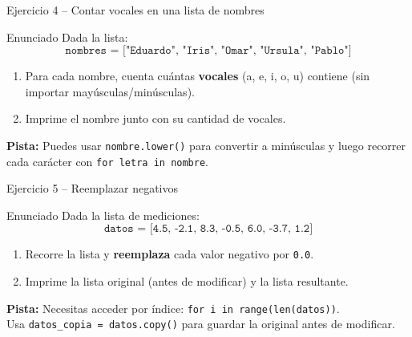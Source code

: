\documentclass[aspectratio=169,xcolor=dvipsnames]{beamer}
\begin{document}
\begin{frame}{Ejercicio 4 -- Contar vocales en una lista de nombres}
    \begin{block}{Enunciado}
        Dada la lista:
        \[ \texttt{nombres = ["Eduardo", "Iris", "Omar", "Ursula", "Pablo"]} \]
        \begin{enumerate}
            \item Para cada nombre, cuenta cuántas \textbf{vocales} (a, e, i, o, u) contiene (sin importar mayúsculas/minúsculas).
            \item Imprime el nombre junto con su cantidad de vocales.
        \end{enumerate}
    \end{block}
    \vspace{0.2cm}
    \textbf{Pista:} Puedes usar \texttt{nombre.lower()} para convertir a minúsculas y luego recorrer cada carácter con \texttt{for letra in nombre}.
\end{frame}

\begin{frame}{Ejercicio 5 -- Reemplazar negativos}
    \begin{block}{Enunciado}
        Dada la lista de mediciones:
        \[ \texttt{datos = [4.5, -2.1, 8.3, -0.5, 6.0, -3.7, 1.2]} \]
        \begin{enumerate}
            \item Recorre la lista y \textbf{reemplaza} cada valor negativo por \texttt{0.0}.
            \item Imprime la lista original (antes de modificar) y la lista resultante.
        \end{enumerate}
    \end{block}
    \vspace{0.2cm}
    \textbf{Pista:} Necesitas acceder por índice: \texttt{for i in range(len(datos))}.\\
    Usa \texttt{datos\_copia = datos.copy()} para guardar la original antes de modificar.
\end{frame}
\end{document}
